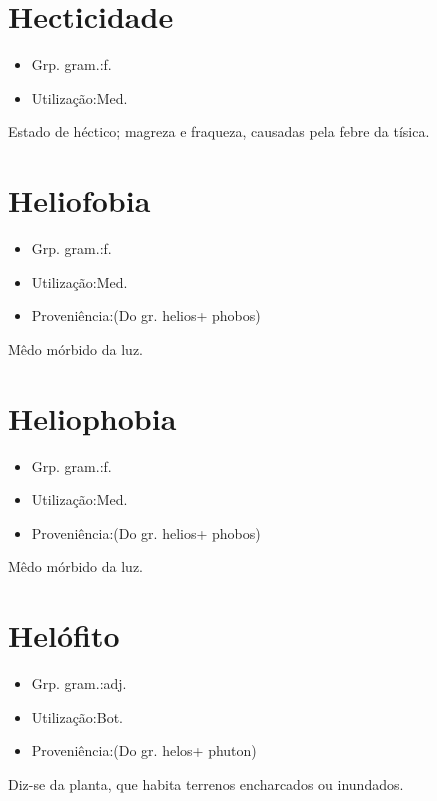 \documentclass{article}
\begin{document}
\section{Hecticidade}
\begin{itemize}
\item {Grp. gram.:f.}
\end{itemize}
\begin{itemize}
\item {Utilização:Med.}
\end{itemize}
Estado de héctico; magreza e fraqueza, causadas pela febre da tísica.
\section{Heliofobia}
\begin{itemize}
\item {Grp. gram.:f.}
\end{itemize}
\begin{itemize}
\item {Utilização:Med.}
\end{itemize}
\begin{itemize}
\item {Proveniência:(Do gr. \textunderscore helios\textunderscore  + \textunderscore phobos\textunderscore )}
\end{itemize}
Mêdo mórbido da luz.
\section{Heliophobia}
\begin{itemize}
\item {Grp. gram.:f.}
\end{itemize}
\begin{itemize}
\item {Utilização:Med.}
\end{itemize}
\begin{itemize}
\item {Proveniência:(Do gr. \textunderscore helios\textunderscore  + \textunderscore phobos\textunderscore )}
\end{itemize}
Mêdo mórbido da luz.
\section{Helófito}
\begin{itemize}
\item {Grp. gram.:adj.}
\end{itemize}
\begin{itemize}
\item {Utilização:Bot.}
\end{itemize}
\begin{itemize}
\item {Proveniência:(Do gr. \textunderscore helos\textunderscore  + \textunderscore phuton\textunderscore )}
\end{itemize}
Diz-se da planta, que habita terrenos encharcados ou inundados.
\end{document}
